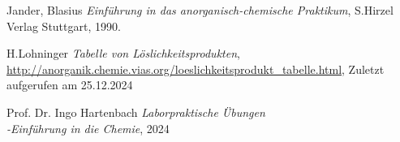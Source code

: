 \begin{thebibliography}{9}
	Jander,
	Blasius
	\textit{Einführung in das anorganisch-chemische Praktikum},
	S.Hirzel Verlag Stuttgart, 1990.
	
    
	
	H.Lohninger
	\textit{Tabelle von Löslichkeitsprodukten},
	\url{http://anorganik.chemie.vias.org/loeslichkeitsprodukt_tabelle.html}, Zuletzt aufgerufen am 25.12.2024



    Prof. Dr. Ingo Hartenbach
    \textit{Laborpraktische Übungen\\
    -Einführung in die Chemie},
    2024
\end{thebibliography}